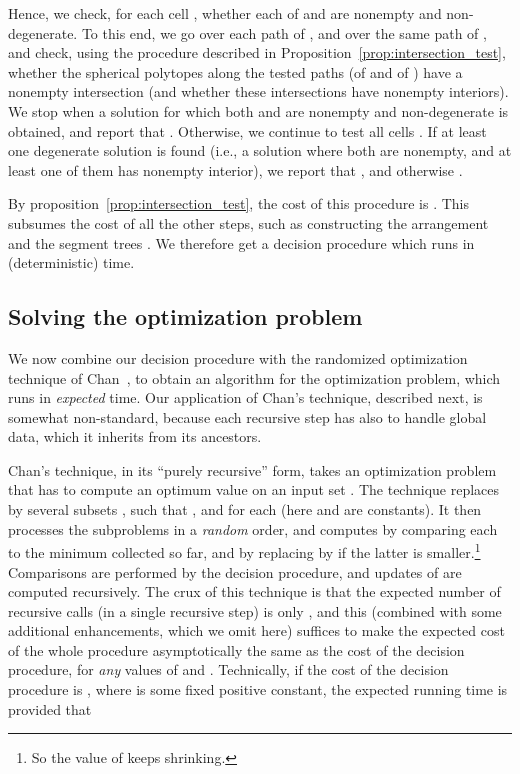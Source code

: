 \documentclass[a4paper,12pt]{article}
\begin{document}
Hence, we check, for each cell , whether each of 
and  are nonempty and non-degenerate. To this end, we
go over each path of , and over the same path of , and
check, using the procedure described in
Proposition~\ref{prop:intersection_test}, whether the spherical
polytopes along the tested paths (of  and of ) have a
nonempty intersection (and whether these intersections have nonempty
interiors). We stop when a solution for which both  and
 are nonempty and non-degenerate is obtained, and
report that . Otherwise, we continue to test all cells
. If at least one degenerate solution is found (i.e., a
solution where both  are nonempty, and at
least one of them has nonempty interior), we report that ,
and otherwise .

By proposition~\ref{prop:intersection_test}, the cost of this
procedure is . This subsumes the cost of all the
other steps, such as constructing the arrangement  and the
segment trees . We therefore get a decision procedure
which runs in  (deterministic) time.

\subsection{Solving the optimization problem}
\label{subsec:optimization_problem}
We now combine our decision procedure with the randomized
optimization technique of Chan~\cite{TCG}, to obtain an algorithm
for the optimization problem, which runs in 
\emph{expected} time. Our application of Chan's technique, described
next, is somewhat non-standard, because each recursive step has also
to handle global data, which it inherits from its ancestors.

Chan's technique, in its ``purely recursive'' form, takes an optimization problem that has to compute an optimum value  on an input set . The technique replaces  by several subsets , such that , and  for each  (here  and  are constants). It then processes the subproblems  in a \emph{random} order, and computes  by comparing each  to the minimum  collected so far, and by replacing  by  if the latter is smaller.\footnote{\small So the value of  keeps shrinking.} Comparisons are performed by the decision procedure, and updates of  are computed recursively. The crux of this technique is that the expected number of recursive calls (in a single recursive step) is only , and this (combined with some additional enhancements, which we omit here) suffices to make the expected cost of the whole procedure asymptotically the same as the cost of the decision procedure, for \emph{any} values of  and . Technically, if the cost  of the decision procedure is
, where  is some fixed positive constant, the expected running time is  provided that
\end{document}
